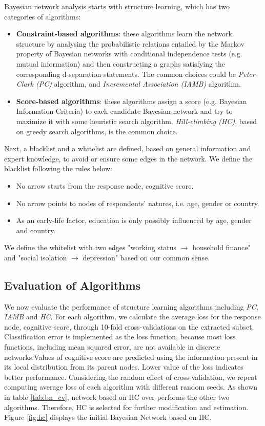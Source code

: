 \documentclass[11pt,twoside]{article}
\numberwithin{Theorem}{section}
\numberwithin{Definition}{section}
\numberwithin{Lemma}{section}
\numberwithin{Algorithm}{section}
\numberwithin{equation}{section}
\begin{document}
Bayesian network analysis starts with structure learning, which has two categories of algorithms:
\begin{itemize}

\item \textbf{Constraint-based algorithms}: these algorithms learn the network structure by analysing the probabilistic relations entailed by the Markov property of Bayesian networks with conditional independence tests (e.g. mutual information) and then constructing a graphs satisfying the corresponding d-separation statements. The common choices could be \emph{Peter-Clark (PC)} algorithm, and \emph{Incremental Association (IAMB)} algorithm.

\item \textbf{Score-based algorithms}: these algorithms assign a score (e.g. Bayesian Information Criteria) to each candidate Bayesian network and try to maximize it with some heuristic search algorithm. \emph{Hill-climbing (HC)}, based on greedy search algorithms, is the common choice.

\end{itemize}

Next, a blacklist and a whitelist are defined, based on general information and expert knowledge, to avoid or ensure some edges in the network. We define the blacklist following the rules below:

\begin{itemize}
	\item No arrow starts from the response node, cognitive score.
	\item No arrow points to nodes of respondents' natures, i.e. age, gender or country.
	\item As an early-life factor, education is only possibly influenced by age, gender and country.
\end{itemize}

We define the whitelist with two edges "working status $\rightarrow$ household finance" and "social isolation $\rightarrow$ depression" based on our common sense.

\subsection{Evaluation of Algorithms}

We now evaluate the performance of structure learning algorithms including \emph{PC}, \emph{IAMB} and \emph{HC}. For each algorithm, we calculate the average loss for the response node, cognitive score, through 10-fold cross-validations on the extracted subset. Classification error is implemented as the loss function, because most loss functions, including mean squared error, are not available in discrete networks.Values of cognitive score are predicted using the information present in its local distribution from its parent nodes. Lower value of the loss indicates better performance. Considering the random effect of cross-validation, we repeat computing average loss of each algorithm with different random seeds. As shown in table \ref{tab:bn_cv}, network based on HC over-performs the other two algorithms. Therefore, HC is selected for further modification and estimation. Figure \ref{fig:hc} displays the initial Bayesian Network based on HC.
\end{document}
